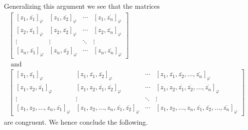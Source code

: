 Generalizing this argument we see that the matrices
\begin{gather*}
\begin{bmatrix}
	[z_{1}, \overline{z_{1}}]_{\varphi} & [z_{1}, \overline{z_{2}}]_{\varphi} & \cdots & [z_{1}, \overline{z_{n}}]_{\varphi} \\
	[z_{2}, \overline{z_{1}}]_{\varphi} & [z_{2}, \overline{z_{2}}]_{\varphi} & \cdots & [z_{2}, \overline{z_{n}}]_{\varphi} \\
	\vdots & \vdots & \ddots & \vdots \\
	[z_{n}, \overline{z_{1}}]_{\varphi} & [z_{n}, \overline{z_{2}}]_{\varphi} & \cdots &  [z_{n}, \overline{z_{n}}]_{\varphi}
\end{bmatrix} \\
\text{ and } \\
\begin{bmatrix}
	[z_{1}, \overline{z_{1}}]_{\varphi} & [z_{1}, \overline{z_{1}}, \overline{z_{2}}]_{\varphi} & \cdots & [z_{1}, \overline{z_{1}}, \overline{z_{2}}, \ldots, \overline{z_{n}}]_{\varphi} \\
	[z_{1}, z_{2}, \overline{z_{1}}]_{\varphi} & [z_{1}, z_{2}, \overline{z_{1}}, \overline{z_{2}}]_{\varphi} & \cdots & [z_{1}, z_{2}, \overline{z_{1}}, \overline{z_{2}}, \ldots, \overline{z_{n}}]_{\varphi} \\
	\vdots & \vdots & \ddots & \vdots \\
	[z_{1}, z_{2}, \ldots, z_{n}, \overline{z_{1}}]_{\varphi} & [z_{1}, z_{2}, \ldots, z_{n}, \overline{z_{1}}, \overline{z_{2}}]_{\varphi} & \cdots &  [z_{1}, z_{2}, \ldots, z_{n}, \overline{z_{1}}, \overline{z_{2}}, \ldots, \overline{z_{n}}]_{\varphi}
\end{bmatrix}
\end{gather*}
are congruent. We hence conclude the following.


